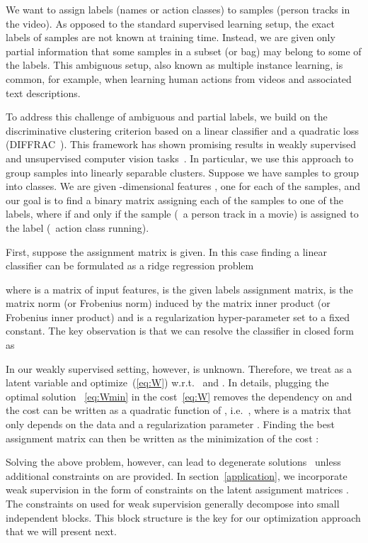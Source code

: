 \documentclass[10pt,twocolumn,letterpaper]{article}
\begin{document}
We want to assign labels (\eg names or action classes) to samples (\eg person tracks in the video).
As opposed to the standard supervised learning setup, the exact labels of samples are not known at training time.
Instead, we are given only partial information that some samples in a subset (or bag) may belong to some of the labels.
This ambiguous setup, also known as multiple instance learning, is common, for example, when learning human actions from videos and associated text descriptions.

To address this challenge of ambiguous and partial labels, we build on the discriminative clustering criterion based on a linear classifier and a quadratic loss (DIFFRAC~\cite{bach07diffrac}).
This framework has shown promising results in weakly supervised and unsupervised computer vision tasks~\cite{alayrac16unsupervised,bojanowski13finding,bojanowski14weakly,bojanowski15weakly,joulin10discriminative,joulin12multi,ramanathan14linking,seguin16instance}. 
In particular, we use this approach to group samples into linearly separable clusters. Suppose we have  samples to group into  classes.
We are given -dimensional features , one for each of the  samples, and our goal is to find a binary matrix 
 assigning each of the  samples to one of the labels, 
where   if and only if the sample  (\eg~a person track in a movie) is assigned to the label  (\eg~action class running). 

\label{cost}
First, suppose the assignment matrix  is given. In this case finding a linear classifier  can be formulated as a ridge regression problem
 
where  is a matrix of input features,  is the given labels assignment matrix,  is the matrix norm 
(or Frobenius norm) induced by the matrix inner product  (or Frobenius inner product) and  is a regularization hyper-parameter set to a fixed constant.  
The key observation is that we can resolve the classifier  in closed form as



In our weakly supervised setting, however,  is unknown. 
Therefore, we treat  as a latent variable and optimize~(\ref{eq:W}) w.r.t.~ and .
In details, plugging the optimal solution ~\eqref{eq:Wmin} in the cost~\eqref{eq:W} removes the dependency on  and the cost can be written as a quadratic function of , i.e.~, where  is a matrix that only depends on the data  and a regularization parameter . Finding the best assignment matrix  can then be written as the minimization of the cost :


Solving the above problem, however, can lead to degenerate solutions~\cite{bach07diffrac} unless additional constraints on  are provided. 
In section~\ref{application}, we incorporate weak supervision in the form of constraints on the latent assignment matrices .
The constraints on  used for weak supervision generally decompose into small independent blocks.
This block structure is the key for our optimization approach that we will present next.
\end{document}
